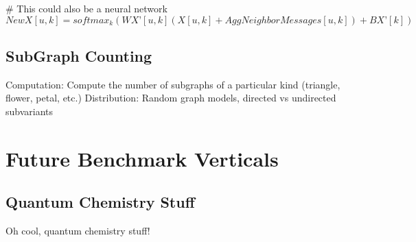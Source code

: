 \documentclass{article}
\begin{document}
# This could also be a neural network
$NewX[u, k] = softmax_k(WX’[u,k](X[u, k] +AggNeighborMessages[u,k]) + BX’[k]) $

\subsection{SubGraph Counting}
	Computation: Compute the number of subgraphs of a particular kind (triangle, flower, petal, etc.)
	Distribution: Random graph models, directed vs undirected subvariants

\section{Future Benchmark Verticals}

\subsection{Quantum Chemistry Stuff}
Oh cool, quantum chemistry stuff!



\end{document}
